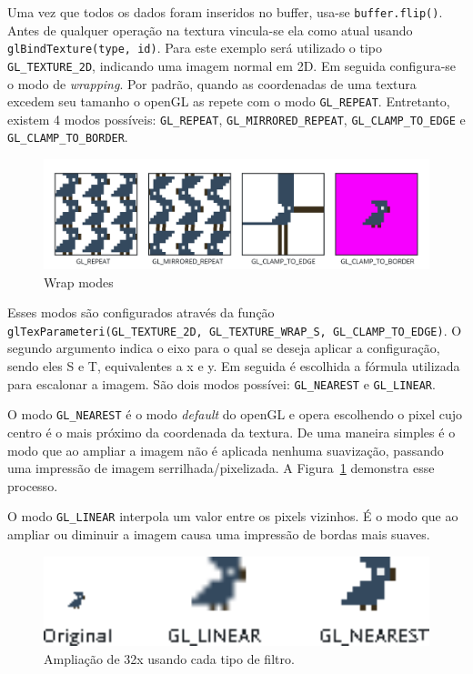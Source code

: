 \documentclass[12pt, 
openright, 
oneside, 
a4paper,    
brazil]{facom-ufu-abntex2}
\begin{document}
Uma vez que todos os dados foram inseridos no buffer, usa-se \texttt{buffer.flip()}. Antes de qualquer operação na textura vincula-se ela como atual usando \texttt{glBindTexture(type, id)}. Para este exemplo será utilizado o tipo \texttt{GL_TEXTURE_2D}, indicando uma imagem normal em 2D. Em seguida configura-se o modo de \textit{wrapping}. Por padrão, quando as coordenadas de uma textura excedem seu tamanho o openGL as repete com o modo \texttt{GL_REPEAT}. Entretanto, existem 4 modos possíveis: \texttt{GL_REPEAT}, \texttt{GL_MIRRORED_REPEAT}, \texttt{GL_CLAMP_TO_EDGE} e \texttt{GL_CLAMP_TO_BORDER}.
\begin{figure}[H]
	\centering
	\includegraphics[width=\textwidth]{imagens/wrap_modes.png}
	\caption{Wrap modes}
\end{figure}
Esses modos são configurados através da função \texttt{glTexParameteri(GL_TEXTURE_2D, GL_TEXTURE_WRAP_S, GL_CLAMP_TO_EDGE)}. O segundo argumento indica o eixo para o qual se deseja aplicar a configuração, sendo eles S e T, equivalentes a x e y. Em seguida é escolhida a fórmula utilizada para escalonar a imagem. São dois modos possívei: \texttt{GL_NEAREST} e \texttt{GL_LINEAR}.

O modo \texttt{GL_NEAREST} é o modo \textit{default} do openGL e opera escolhendo o pixel cujo centro é o mais próximo da coordenada da textura. De uma maneira simples é o modo que ao ampliar a imagem não é aplicada nenhuma suavização, passando uma impressão de imagem serrilhada/pixelizada. A Figura~\ref{fig:ampli} demonstra esse processo.

O modo \texttt{GL_LINEAR} interpola um valor entre os pixels vizinhos. É o modo que ao ampliar ou diminuir a imagem causa uma impressão de bordas mais suaves.

\begin{figure}[H]
	\centering
	\includegraphics[width=36em]{imagens/gl_filters.png}
	\caption{Ampliação de 32x usando cada tipo de filtro. \label{fig:ampli}}
\end{figure}
\end{document}
